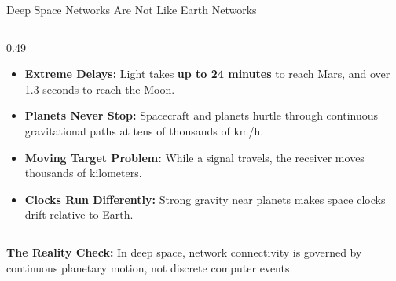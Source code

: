 \documentclass[aspectratio=169,10pt]{beamer}
\begin{document}
\begin{frame}{Deep Space Networks Are Not Like Earth Networks}
\begin{columns}[T]
    \begin{column}{0.49\textwidth}
      \begin{tcolorbox}[colback=lightCyan,colframe=electricCyan!80!black,title=\textbf{Why Deep Space Breaks Assumptions}]
        \small
        \begin{itemize}\setlength{\itemsep}{0.8pt}
          \item \textbf{Extreme Delays:} Light takes \textbf{up to 24 minutes} to reach Mars, and over 1.3 seconds to reach the Moon.
          \item \textbf{Planets Never Stop:} Spacecraft and planets hurtle through continuous gravitational paths at tens of thousands of km/h.
          \item \textbf{Moving Target Problem:} While a signal travels, the receiver moves thousands of kilometers.
          \item \textbf{Clocks Run Differently:} Strong gravity near planets makes space clocks drift relative to Earth.
        \end{itemize}
      \end{tcolorbox}
    \end{column}
  \end{columns}

  \vspace{2pt}
  \begin{tcolorbox}[colback=lightGold,colframe=goldAccent,top=1.5pt,bottom=1.5pt]
    \centering\small
    \textbf{The Reality Check:} In deep space, network connectivity is governed by continuous planetary motion, not discrete computer events.
  \end{tcolorbox}
\end{frame}
\end{document}

